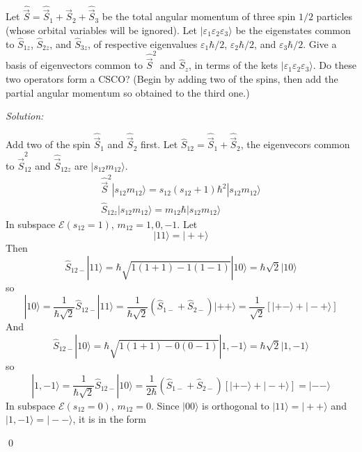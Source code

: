\documentclass[10pt,a4paper]{article}
\newenvironment{problem}[2][Problem]{\begin{trivlist}
\item[\hskip \labelsep {\bfseries #1}\hskip \labelsep {\bfseries #2.}]}{\end{trivlist}}
\newenvironment{sol}
    {\emph{Solution:}
    }
    {
    \qed
    }
\begin{document}
\begin{problem}{5}
[C-T Exercise 10-5] Let $\hat{\vec{S}}=\hat{\vec{S}}_1+\hat{\vec{S}}_2+\hat{\vec{S}}_3$ be the total angular momentum of three spin $1/2$ particles (whose orbital variables will be ignored). Let $|\varepsilon_1\varepsilon_2\varepsilon_3\rangle$ be the eigenstates common to $\hat{S}_{1z}$, $\hat{S}_{2z}$, and $\hat{S}_{3z}$, of respective eigenvalues $\varepsilon_1\hbar/2$, $\varepsilon_2\hbar/2$, and $\varepsilon_3\hbar/2$. Give a basis of eigenvectors common to $\hat{\vec{S}}^2$ and $\hat{S}_z$, in terms of the kets $|\varepsilon_1\varepsilon_2\varepsilon_3\rangle$. Do these two operators form a CSCO? (Begin by adding two of the spins, then add the partial angular momentum so obtained to the third one.)
\end{problem}
\begin{sol}
Add two of the spin $\hat{\vec{S}}_1$ and $\hat{\vec{S}}_2$ first. Let $\hat{S}_{12}=\hat{\vec{S}}_{1}+\hat{\vec{S}}_2$, the eigenvecors common to $\hat{\vec{S}}_{12}^2$ and $\hat{\vec{S}}_{12z}$ are $|s_{12}m_{12}\rangle$.
\begin{gather}
\hat{\vec{S}}^2|s_{12}m_{12}\rangle=s_{12}(s_{12}+1)\hbar^2|s_{12}m_{12}\rangle\\
\hat{S}_{12z}|s_{12}m_{12}\rangle=m_{12}\hbar|s_{12}m_{12}\rangle
\end{gather}
In subspace $\mathscr{E}(s_{12}=1)$, $m_{12}=1,0,-1$. Let
\begin{equation}
|11\rangle=|++\rangle
\end{equation}
Then
\begin{equation}
\hat{S}_{12-}|11\rangle=\hbar\sqrt{1(1+1)-1(1-1)}|10\rangle=\hbar\sqrt{2}|10\rangle
\end{equation}
so
\begin{equation}
|10\rangle=\frac{1}{\hbar\sqrt{2}}\hat{S}_{12-}|11\rangle=\frac{1}{\hbar\sqrt{2}}(\hat{S}_{1-}+\hat{S}_{2-})|++\rangle=\frac{1}{\sqrt{2}}[|+-\rangle+|-+\rangle]
\end{equation}
And
\begin{equation}
\hat{S}_{12-}|10\rangle=\hbar\sqrt{1(1+1)-0(0-1)}|1,-1\rangle=\hbar\sqrt{2}|1,-1\rangle
\end{equation}
so
\begin{equation}
|1,-1\rangle=\frac{1}{\hbar\sqrt{2}}\hat{S}_{12-}|10\rangle=\frac{1}{2\hbar}(\hat{S}_{1-}+\hat{S}_{2-})[|+-\rangle+|-+\rangle]=|--\rangle
\end{equation}
In subspace $\mathscr{E}(s_{12}=0)$, $m_{12}=0$. Since $|00\rangle$ is orthogonal to $|11\rangle=|++\rangle$ and $|1,-1\rangle=|--\rangle$, it is in the form

\end{sol}
\end{document}
